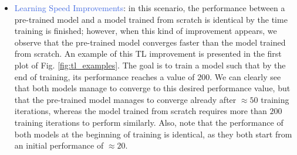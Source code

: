 \begin{itemize}
	\item \textcolor{RoyalBlue}{Learning Speed Improvements}: in this scenario, the performance between a pre-trained model and a model trained from scratch is identical by the time training is finished; however, when this kind of improvement appears, we observe that the pre-trained model converges faster than the model trained from scratch. An example of this TL improvement is presented in the first plot of Fig. \ref{fig:tl_examples}. The goal is to train a model such that by the end of training, its performance reaches a value of $200$. We can clearly see that both models manage to converge to this desired performance value, but that the pre-trained model manages to converge already after $\approx 50$ training iterations, whereas the model trained from scratch requires more than $200$ training iterations to perform similarly. Also, note that the performance of both models at the beginning of training is identical, as they both start from an initial performance of $\approx20$.


\end{itemize}
